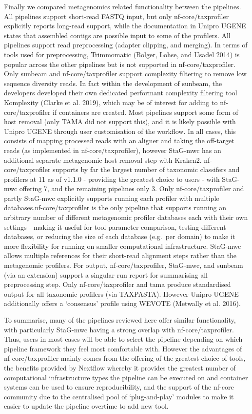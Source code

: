 \documentclass[
]{article}
\begin{document}
Finally we compared metagenomics related functionality between the
pipelines. All pipelines support short-read FASTQ input, but only
nf-core/taxprofiler explicitly reports long-read support, while the
documentation in Unipro UGENE states that assembled contigs are possible
input to some of the profilers. All pipelines support read preprocessing
(adapter clipping, and merging). In terms of tools used for
preprocessing, Trimmomatic (Bolger, Lohse, and Usadel 2014) is popular
across the other pipelines but is not supported in nf-core/taxprofiler.
Only sunbeam and nf-core/taxprofiler support complexity filtering to
remove low sequence diversity reads. In fact within the development of
sunbeam, the developers developed their own dedicated performant
complexity filtering tool Komplexity (Clarke et al. 2019), which may be
of interest for adding to nf-core/taxprofiler if containers are created.
Most pipelines support some form of host removal (only TAMA did not
support this), and it is likely possible with Unipro UGENE through user
customisation of the workflow. In all cases, this consists of mapping
processed reads with an aligner and taking the off-target reads (as
implemented in nf-core/taxprofiler), however StaG-mwc has an additional
separate metagenomic host removal step with Kraken2. nf-core/taxprofiler
supports by far the largest number of taxonomic classifers and profilers
at 11 as of v1.1.0 - providing the greatest choice to users - with
StaG-mwc offering 7, and the remaining pipelines only 3. Only
nf-core/taxprofiler and partly StaG-mwc explicitly supports running each
profiler with multiple databases.nf-core/taxprofiler is the only
pipeline that supports running an arbitrary number of different
metagenomic profiler databases each with their own settings - making it
useful for tool parameter comparison, testing different databases, or
reducing the size of each database (e.g.~per domain) to make it more
flexibility for running on smaller computational infrastructure.
StaG-mwc allows multiple references for their short-read alignment steps
rather than the metagenomic profilers. For output, nf-core/taxprofiler,
StaG-mwc, and sunbeam (via an extension) support a singular run report
for summarising all preprocessing step. Only nf-core/taxprofiler and
tama produce standardised output for all taxonomic profilers (via
TAXPASTA). However Unipro UGENE additionally offers a `consensus'
profile using WEVOTE (Metwally et al. 2016).

To summarise, many of the pipelines reviewed here offer similar
functionality, with particularly StaG-mwc having a strong overlap with
nf-core/taxprofiler. Thus, users in most cases will be able to select
the pipeline depending on which pipeline framework they feel most
comfortable with. However the advantages of nf-core/taxprofiler mainly
comes from the offering of the greatest choice of tools, the benefits
provided by Nextflow whereby it provides the greatest number of
computational infrastructure types the pipeline can be executed on and
container systems can be used to ensure reproducibility, and the support
of the nf-core community due to the centralised pool of `plug-and-play'
modules to make it easier to update the pipeline overtime to add new
tool.
\end{document}
